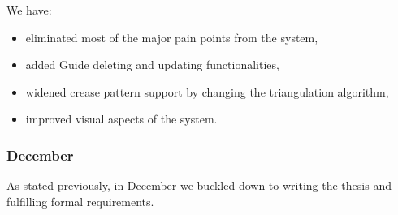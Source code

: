 \medskip

We have:

\begin{itemize}
	\item eliminated most of the major pain points from the system,
	\item added Guide deleting and updating functionalities,
	\item widened crease pattern support by changing the triangulation algorithm,
	\item improved visual aspects of the system.
\end{itemize}


\subsubsection{December}

As stated previously, in December we buckled down to writing the thesis and fulfilling formal requirements.
